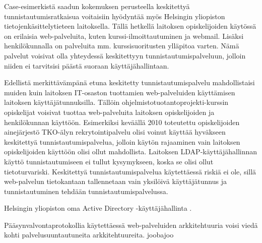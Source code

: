 Case-esimerkistä saadun kokemuksen perusteella keskitettyä tunnistautumisratkaisua voitaisiin hyödyntää myös Helsingin yliopiston tietojenkäsittelytieteen laitoksella. Tällä hetkellä laitoksen opiskelijoiden käytössä on erilaisia web-palveluita, kuten kurssi-ilmoittautuminen ja webmail. Lisäksi henkilökunnalla on palveluita mm. kurssisuoritusten ylläpitoa varten. Nämä palvelut voisivat olla yhteydessä keskitettyyn tunnistautumispalveluun, jolloin niiden ei tarvitsisi päästä suoraan käyttäjähallintaan.

Edellistä merkittävämpänä etuna keskitetty tunnistautumispalvelu mahdollistaisi muiden kuin laitoksen IT-osaston tuottamien web-palveluiden käyttämisen laitoksen käyttäjätunnuksilla. Tällöin ohjelmistotuotantoprojekti-kurssin opiskelijat voisivat tuottaa web-palveluita laitoksen opiskelijoiden ja henkilökunnan käyttöön. Esimerkiksi keväällä 2010 toteutettu opiskelijoiden ainejärjestö TKO-älyn rekrytointipalvelu olisi voinut käyttää hyväkseen keskitettyä tunnistautumispalvelua, jolloin käytön rajaaminen vain laitoksen opiskelijoiden käyttöön olisi ollut mahdollista. Laitoksen LDAP-käyttäjähallinnan käyttö tunnistautumiseen ei tullut kysymykseen, koska se olisi ollut tietoturvariski. Keskitettyä tunnistautumispalvelua käytettäessä riskiä ei ole, sillä web-palvelun tietokantaan tallennetaan vain yksilöivä käyttäjätunnus ja tunnistautuminen tehdään tunnistautumispalvelussa.

Helsingin yliopiston oma Active Directory -käyttäjähallinta \cite{tietotekniikkaa}.

Pääsynvalvontaprotokollia käytettäessä web-palveluiden arkkitehtuuria voisi viedä kohti palvelusuuntautuneita arkkitehtuureita. joobajoo